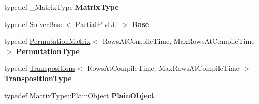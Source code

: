 \begin{DoxyCompactItemize}
\item 
\mbox{\label{group___l_u___module_a0736a02bea471dbed733a1fb2cebb678}} 
typedef \+\_\+\+Matrix\+Type {\bfseries Matrix\+Type}
\item 
\mbox{\label{group___l_u___module_a2131c6ccbf78c1dcfe862654beed1272}} 
typedef \hyperlink{class_eigen_1_1_solver_base}{Solver\+Base}$<$ \hyperlink{group___l_u___module_class_eigen_1_1_partial_piv_l_u}{Partial\+Piv\+LU} $>$ {\bfseries Base}
\item 
\mbox{\label{group___l_u___module_a5b5f010f3e7acdff7b7c72db874dc3d9}} 
typedef \hyperlink{group___core___module_class_eigen_1_1_permutation_matrix}{Permutation\+Matrix}$<$ Rows\+At\+Compile\+Time, Max\+Rows\+At\+Compile\+Time $>$ {\bfseries Permutation\+Type}
\item 
\mbox{\label{group___l_u___module_acf0c9c89566e8aba4fae8f470c5a8d4a}} 
typedef \hyperlink{group___core___module_class_eigen_1_1_transpositions}{Transpositions}$<$ Rows\+At\+Compile\+Time, Max\+Rows\+At\+Compile\+Time $>$ {\bfseries Transposition\+Type}
\item 
\mbox{\label{group___l_u___module_aaae954615fa4a1dd947fe7d380bf7206}} 
typedef Matrix\+Type\+::\+Plain\+Object {\bfseries Plain\+Object}
\end{DoxyCompactItemize}
